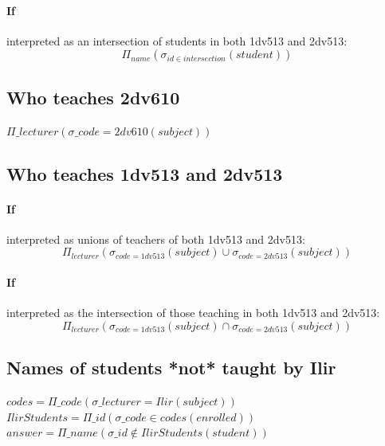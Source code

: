\documentclass[12pt]{article}
\begin{document}
\paragraph{If} interpreted as an intersection of students in both 1dv513 and 2dv513:
\begin {equation}
\Pi_{name}(\sigma_{id \in intersection}(student))\label{eq:equation2}
\end {equation}

\subsection {Who teaches 2dv610}\label{subsec:who-teaches-2dv610}
\begin{math}
\Pi\_{lecturer} (\sigma\_{code=2dv610}(subject))
\end{math}

\subsection {Who teaches 1dv513 and 2dv513}\label{subsec:who-teaches-1dv513-and-2dv513}

\paragraph{If} interpreted as unions of teachers of both 1dv513 and 2dv513:
\begin {equation}
\Pi_{lecturer} (\sigma_{code=1dv513}(subject) \cup \sigma_{code=2dv513}(subject))\label{eq:equation3}
\end {equation}
\paragraph{If} interpreted as the intersection of those teaching in both 1dv513 and 2dv513:
\begin {equation}
\Pi_{lecturer} (\sigma_{code=1dv513}(subject) \cap \sigma_{code=2dv513}(subject))\label{eq:equation4}
\end {equation}

\subsection {Names of students *not* taught by Ilir}\label{subsec:names-of-students-*not*-taught-by-ilir}

\begin {math}
codes = \Pi\_{code}(\sigma\_{lecturer=Ilir}(subject))
\end{math}
\\
\begin {math}
IlirStudents = \Pi\_{id}(\sigma\_{code \in codes}(enrolled))
\end {math}
\\
\begin {math}
answer = \Pi\_{name}(\sigma\_{id \notin IlirStudents}(student))
\end {math}
\end{document}
